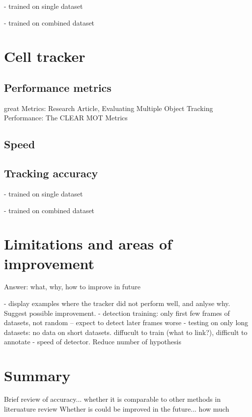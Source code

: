 			- trained on single dataset
			
			- trained on combined dataset
	\section{Cell tracker \statusnew}
		\subsection{Performance metrics \statusnew}
		
		great Metrics: Research Article, Evaluating Multiple Object Tracking Performance: The CLEAR MOT Metrics
		
		\subsection{Speed \statusnew}
		\subsection{Tracking accuracy \statusnew}
			- trained on single dataset
						
			- trained on combined dataset
	\section{Limitations and areas of improvement \statusnew}
		Answer: what, why, how to improve in future
		
		- display examples where the tracker did not perform well, and anlyse why. Suggest possible improvement.
		- detection training: only first few frames of datasets, not random -- expect to detect later frames worse
		- testing on only long datasets: no data on short datasets. diffucult to train (what to link?), difficult to annotate
		- speed of detector. Reduce number of hypothesis		

	\section{Summary \statusnew}
	
		Brief review of accuracy... whether it is comparable to other methods in literuature review
		Whether is could be improved in the future... how much